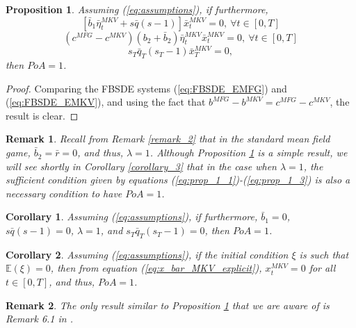 \documentclass[11pt]{article}
\newtheorem{remark}{Remark}
\newtheorem{proposition}{Proposition}
\newtheorem{corollary}{Corollary}
\begin{document}
\begin{proposition}
Assuming (\ref{eq:assumptions}), if furthermore,
\begin{equation}
    \left[\bar{b}_1\bar{\eta}_t^{MKV}+s\bar{q}(s-1)\right]\bar{x}_t^{MKV}=0,\ \forall t \in [0,T] \label{eq:prop_1_1}
\end{equation}
\begin{equation}
    (c^{MFG}-c^{MKV})(b_2+\bar{b}_2)\bar{\eta}_t^{MKV}\bar{x}_t^{MKV}=0,\ \forall t \in [0,T]\label{eq:prop_1_2}
\end{equation}
\begin{equation}
    s_T\bar{q}_T(s_T-1)\bar{x}_T^{MKV}=0, \label{eq:prop_1_3}
\end{equation}
then $PoA=1$.
\label{eq:lq_prop}
\end{proposition}

\begin{proof}
    Comparing the FBSDE systems (\ref{eq:FBSDE_EMFG}) and (\ref{eq:FBSDE_EMKV}), and using the fact that $b^{MFG}-b^{MKV}=c^{MFG}-c^{MKV}$, the result is clear.
\end{proof}

\begin{remark}
	Recall from Remark \ref{remark_2} that in the standard mean field game, $\bar{b}_2=\bar{r}=0$, and thus, $\lambda=1$. Although Proposition \ref{eq:lq_prop} is a simple result, we will see shortly in Corollary \ref{corollary_3} that in the case when $\lambda=1$, the sufficient condition given by equations (\ref{eq:prop_1_1})-(\ref{eq:prop_1_3}) is also a necessary condition to have $PoA=1$.
\end{remark}

\begin{corollary}
	Assuming (\ref{eq:assumptions}), if furthermore, $\bar{b}_1=0$, $s\bar{q}(s-1)=0$, $\lambda=1$, and $s_T\bar{q}_T(s_T-1)=0$,
	then $PoA=1$.
	\label{corollary_1}
\end{corollary}

\begin{corollary}
	Assuming (\ref{eq:assumptions}), if the initial condition $\xi$ is such that $\mathbb{E}(\xi)=0$, then from equation (\ref{eq:x_bar_MKV_explicit}), $x^{MKV}_t =0$ for all $t\in[0,T]$, and thus, $PoA=1$.
	\label{corollary_2}
\end{corollary}

\begin{remark}
The only result similar to Proposition \ref{eq:lq_prop} that we are aware of is Remark 6.1 in \cite{nourian2013nash}.
\end{remark}
\end{document}
